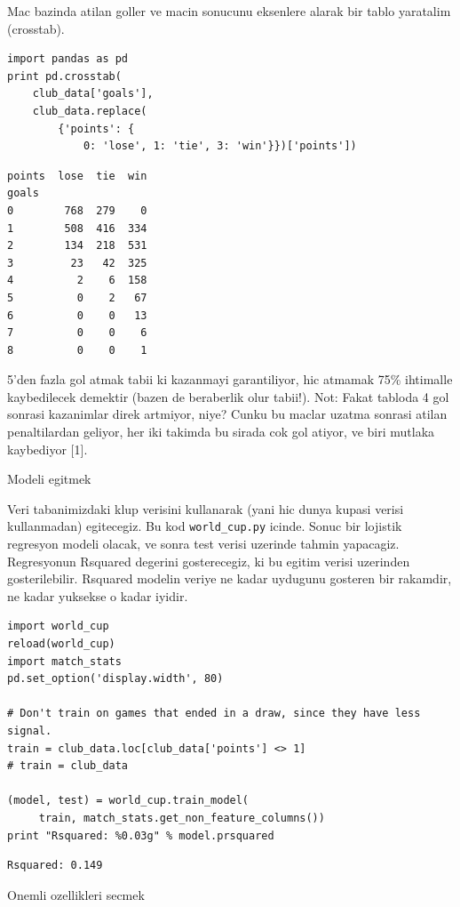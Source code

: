 \documentclass[12pt,fleqn]{article}\usepackage{../common}
\begin{document}
Mac bazinda atilan goller ve macin sonucunu eksenlere alarak bir tablo
yaratalim (crosstab).

\begin{verbatim}
import pandas as pd
print pd.crosstab(
    club_data['goals'], 
    club_data.replace(
        {'points': {
            0: 'lose', 1: 'tie', 3: 'win'}})['points'])
\end{verbatim}

\begin{verbatim}
points  lose  tie  win
goals                 
0        768  279    0
1        508  416  334
2        134  218  531
3         23   42  325
4          2    6  158
5          0    2   67
6          0    0   13
7          0    0    6
8          0    0    1
\end{verbatim}

5'den fazla gol atmak tabii ki kazanmayi garantiliyor, hic atmamak 75\%
ihtimalle kaybedilecek demektir (bazen de beraberlik olur tabii!). Not:
Fakat tabloda 4 gol sonrasi kazanimlar direk artmiyor, niye? Cunku bu
maclar uzatma sonrasi atilan penaltilardan geliyor, her iki takimda bu
sirada cok gol atiyor, ve biri mutlaka kaybediyor [1].

Modeli egitmek

Veri tabanimizdaki klup verisini kullanarak (yani hic dunya kupasi verisi
kullanmadan) egitecegiz. Bu kod  \verb!world_cup.py! icinde. Sonuc bir
lojistik regresyon modeli olacak, ve sonra test verisi uzerinde tahmin
yapacagiz. Regresyonun Rsquared degerini gosterecegiz, ki bu egitim
verisi uzerinden gosterilebilir. Rsquared modelin veriye ne kadar uydugunu
gosteren bir rakamdir, ne kadar yuksekse o kadar iyidir.

\begin{verbatim}
import world_cup
reload(world_cup)
import match_stats
pd.set_option('display.width', 80)

# Don't train on games that ended in a draw, since they have less signal.
train = club_data.loc[club_data['points'] <> 1] 
# train = club_data

(model, test) = world_cup.train_model(
     train, match_stats.get_non_feature_columns())
print "Rsquared: %0.03g" % model.prsquared
\end{verbatim}

\begin{verbatim}
Rsquared: 0.149
\end{verbatim}

Onemli ozellikleri secmek
\end{document}
